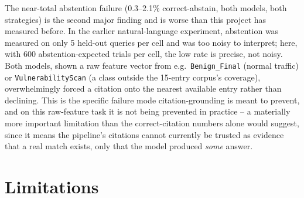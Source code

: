 \documentclass[11pt]{article}
\begin{document}
The near-total abstention failure (0.3--2.1\% correct-abstain, both
models, both strategies) is the second major finding and is worse than
this project has measured before. In the earlier natural-language
experiment, abstention was measured on only 5 held-out queries per cell and
was too noisy to interpret; here, with 600 abstention-expected trials per
cell, the low rate is precise, not noisy. Both models, shown a raw feature
vector from e.g.\ \texttt{Benign\_Final} (normal traffic) or
\texttt{VulnerabilityScan} (a class outside the 15-entry corpus's
coverage), overwhelmingly forced a citation onto the nearest available
entry rather than declining. This is the specific failure mode
citation-grounding is meant to prevent, and on this raw-feature task it is
not being prevented in practice -- a materially more important limitation
than the correct-citation numbers alone would suggest, since it means the
pipeline's citations cannot currently be trusted as evidence that a real
match exists, only that the model produced \emph{some} answer.

\section{Limitations}
\label{sec:limitations}
\end{document}
